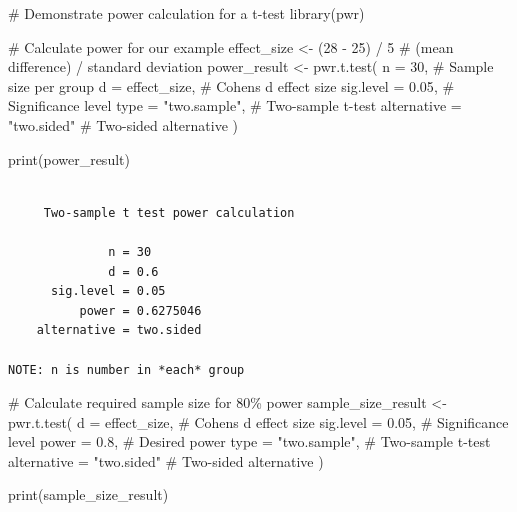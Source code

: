 \documentclass[
  letterpaper,
]{book}
\newenvironment{Shaded}{\begin{snugshade}}{\end{snugshade}}
\newcommand{\AttributeTok}[1]{\textcolor[rgb]{0.40,0.45,0.13}{#1}}
\newcommand{\CommentTok}[1]{\textcolor[rgb]{0.37,0.37,0.37}{#1}}
\newcommand{\DecValTok}[1]{\textcolor[rgb]{0.68,0.00,0.00}{#1}}
\newcommand{\FloatTok}[1]{\textcolor[rgb]{0.68,0.00,0.00}{#1}}
\newcommand{\FunctionTok}[1]{\textcolor[rgb]{0.28,0.35,0.67}{#1}}
\newcommand{\NormalTok}[1]{\textcolor[rgb]{0.00,0.23,0.31}{#1}}
\newcommand{\OtherTok}[1]{\textcolor[rgb]{0.00,0.23,0.31}{#1}}
\newcommand{\SpecialCharTok}[1]{\textcolor[rgb]{0.37,0.37,0.37}{#1}}
\newcommand{\StringTok}[1]{\textcolor[rgb]{0.13,0.47,0.30}{#1}}
\begin{document}
\begin{Shaded}
\begin{Highlighting}[]
\CommentTok{\# Demonstrate power calculation for a t{-}test}
\FunctionTok{library}\NormalTok{(pwr)}

\CommentTok{\# Calculate power for our example}
\NormalTok{effect\_size }\OtherTok{\textless{}{-}}\NormalTok{ (}\DecValTok{28} \SpecialCharTok{{-}} \DecValTok{25}\NormalTok{) }\SpecialCharTok{/} \DecValTok{5}  \CommentTok{\# (mean difference) / standard deviation}
\NormalTok{power\_result }\OtherTok{\textless{}{-}} \FunctionTok{pwr.t.test}\NormalTok{(}
  \AttributeTok{n =} \DecValTok{30}\NormalTok{,                    }\CommentTok{\# Sample size per group}
  \AttributeTok{d =}\NormalTok{ effect\_size,           }\CommentTok{\# Cohen\textquotesingle{}s d effect size}
  \AttributeTok{sig.level =} \FloatTok{0.05}\NormalTok{,          }\CommentTok{\# Significance level}
  \AttributeTok{type =} \StringTok{"two.sample"}\NormalTok{,       }\CommentTok{\# Two{-}sample t{-}test}
  \AttributeTok{alternative =} \StringTok{"two.sided"}  \CommentTok{\# Two{-}sided alternative}
\NormalTok{)}

\FunctionTok{print}\NormalTok{(power\_result)}
\end{Highlighting}
\end{Shaded}

\begin{verbatim}

     Two-sample t test power calculation 

              n = 30
              d = 0.6
      sig.level = 0.05
          power = 0.6275046
    alternative = two.sided

NOTE: n is number in *each* group
\end{verbatim}

\begin{Shaded}
\begin{Highlighting}[]
\CommentTok{\# Calculate required sample size for 80\% power}
\NormalTok{sample\_size\_result }\OtherTok{\textless{}{-}} \FunctionTok{pwr.t.test}\NormalTok{(}
  \AttributeTok{d =}\NormalTok{ effect\_size,           }\CommentTok{\# Cohen\textquotesingle{}s d effect size}
  \AttributeTok{sig.level =} \FloatTok{0.05}\NormalTok{,          }\CommentTok{\# Significance level}
  \AttributeTok{power =} \FloatTok{0.8}\NormalTok{,               }\CommentTok{\# Desired power}
  \AttributeTok{type =} \StringTok{"two.sample"}\NormalTok{,       }\CommentTok{\# Two{-}sample t{-}test}
  \AttributeTok{alternative =} \StringTok{"two.sided"}  \CommentTok{\# Two{-}sided alternative}
\NormalTok{)}

\FunctionTok{print}\NormalTok{(sample\_size\_result)}
\end{Highlighting}
\end{Shaded}
\end{document}

